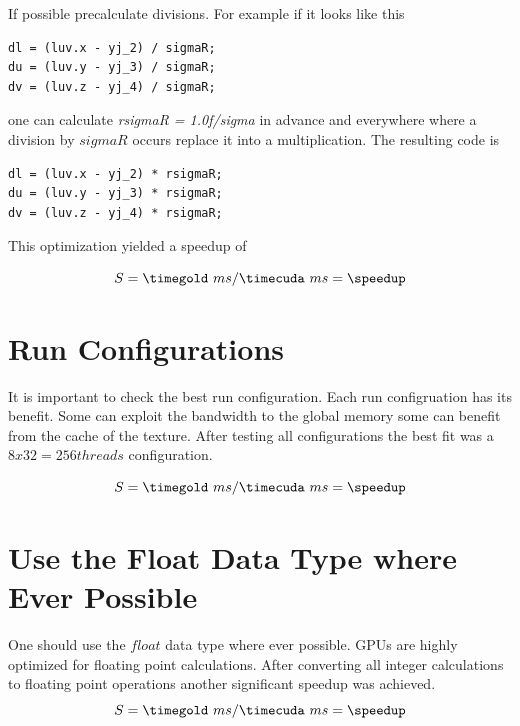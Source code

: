 If possible precalculate divisions. For example if it looks like this
\begin{lstlisting}[caption=Divison, label=lst:division]
dl = (luv.x - yj_2) / sigmaR;               
du = (luv.y - yj_3) / sigmaR;               
dv = (luv.z - yj_4) / sigmaR;
\end{lstlisting}
one can calculate \emph{rsigmaR = 1.0f/sigma} in advance and everywhere where a division by
$sigmaR$ occurs replace it into a multiplication. The resulting code is
\begin{lstlisting}[caption=Precalculated Divison, label=lst:precalcdivision]
dl = (luv.x - yj_2) * rsigmaR;               
du = (luv.y - yj_3) * rsigmaR;               
dv = (luv.z - yj_4) * rsigmaR;
\end{lstlisting}

This optimization yielded  a speedup of 

\fpDiv{\speedup}{\timegold}{\timecuda}
\begin{equation*}\label{eq:speedup0}
	S = \timegold\ ms/\timecuda\ ms = \speedup
\end{equation*}


\section{Run Configurations} %
\label{sec:run_configurations}

It is important to check the best run configuration. Each run configruation 
has its benefit. Some can exploit the bandwidth to the global memory some can
benefit from the cache of the texture. After testing all configurations the 
best fit was a $8x32=256 threads$ configuration.

\fpDiv{\speedup}{\timegold}{\timecuda}
\begin{equation*}\label{eq:speedup0}
	S = \timegold\ ms/\timecuda\ ms = \speedup
\end{equation*}



\section{Use the Float Data Type where Ever Possible}
One should use the $float$ data type where ever possible. \glspl{GPU} are 
highly optimized for floating point calculations. After converting all integer
calculations to floating point operations another significant speedup was 
achieved.
\fpDiv{\speedup}{\timegold}{\timecuda}
\begin{equation*}\label{eq:speedup0}
	S = \timegold\ ms/\timecuda\ ms = \speedup
\end{equation*}



